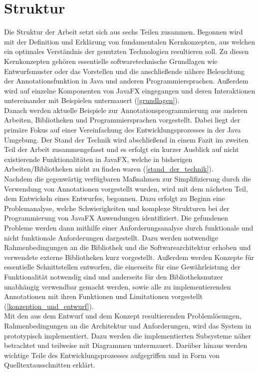 \section{Struktur}
\label{struktur}
Die Struktur der Arbeit setzt sich aus sechs Teilen zusammen. Begonnen wird mit der Definition und Erklärung von fundamentalen Kernkonzepten, aus welchen ein optimales Verständnis der genutzten Technologien resultieren soll. Zu diesen Kernkonzepten gehören essentielle softwaretechnische Grundlagen wie Entwurfsmuster oder das Vorstellen und die anschließende nähere Beleuchtung der Annotationsfunktion in Java und anderen Programmiersprachen. Außerdem wird auf einzelne Komponenten von JavaFX eingegangen und deren Interaktionen untereinander mit Beispielen untermauert (\ref{grundlagen}).\\
Danach werden aktuelle Beispiele zur Annotationsprogrammierung aus anderen Arbeiten, Bibliotheken und Programmiersprachen vorgestellt. Dabei liegt der primäre Fokus auf einer Vereinfachung des Entwicklungsprozesses in der Java Umgebung. Der Stand der Technik wird abschließend in einem Fazit im zweiten Teil der Arbeit zusammengefasst und es erfolgt ein kurzer Ausblick auf nicht existierende Funktionalitäten in JavaFX, welche in bisherigen Arbeiten/Bibliotheken nicht zu finden waren (\ref{stand_der_technik}).\\
Nachdem die gegenwärtig verfügbaren Maßnahmen zur Simplifizierung durch die Verwendung von Annotationen vorgestellt wurden, wird mit dem nächsten Teil, dem Entwickeln eines Entwurfes, begonnen. Dazu erfolgt zu Beginn eine Problemanalyse, welche Schwierigkeiten und komplexe Strukturen bei der Programmierung von JavaFX Anwendungen identifiziert. Die gefundenen Probleme werden dann mithilfe einer Anforderungsanalyse durch funktionale und nicht funktionale Anforderungen dargestellt. Dazu werden notwendige Rahmenbedingungen an die Bibliothek und die Softwarearchitektur erhoben und verwendete externe Bibliotheken kurz vorgestellt. Außerdem werden Konzepte für essentielle Schnittstellen entworfen, die einerseits für eine Gewährleistung der Funktionalität notwendig sind und anderseits für den Bibliotheksnutzer unabhängig verwendbar gemacht werden, sowie alle zu implementierenden Annotationen mit ihren Funktionen und Limitationen vorgestellt (\ref{konzeption_und_entwurf}).\\
Mit den aus dem Entwurf und dem Konzept resultierenden Problemlösungen, Rahmenbedingungen an die Architektur und Anforderungen, wird das System in  prototypisch implementiert. Dazu werden die implementierten Subsysteme näher betrachtet und teilweise mit Diagrammen untermauert. Darüber hinaus werden wichtige Teile des Entwicklungsprozesses aufgegriffen und in Form von Quelltextausschnitten erklärt.\\
